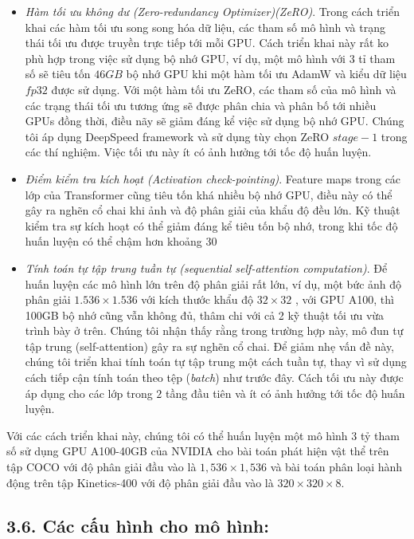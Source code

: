 \documentclass[times, twocolumn]{zHenriquesLab-StyleBioRxiv}
\begin{document}
\begin{itemize}
    \item \textit{Hàm tối ưu không dư (Zero-redundancy Optimizer)(ZeRO)}. Trong cách triển khai các hàm tối ưu song song hóa dữ liệu, các tham số mô hình và trạng thái tối ưu được truyền trực tiếp tới mỗi GPU. Cách triển khai này rất ko phù hợp trong việc sử dụng bộ nhớ GPU, ví dụ, một mô hình với $3$ tỉ tham số sẽ tiêu tốn $46GB$ bộ nhớ GPU khi một hàm tối ưu AdamW và kiểu dữ liệu $fp32$ được sử dụng. Với một hàm tối ưu ZeRO, các tham số của mô hình và các trạng thái tối ưu tương ứng sẽ được phân chia và phân bố tới nhiều GPUs đồng thời, điều nãy sẽ giảm đáng kể việc sử dụng bộ nhớ GPU. Chúng tôi áp dụng DeepSpeed framework và sử dụng tùy chọn ZeRO $stage-1$ trong các thí nghiệm. Việc tối ưu này ít có ảnh hưởng tới tốc độ huấn luyện.
    \item \textit{Điểm kiểm tra kích hoạt (Activation check-pointing)}. Feature maps trong các lớp của Transformer cũng tiêu tốn khá nhiều bộ nhớ GPU, điều này có thể gây ra nghẽn cổ chai khi ảnh và độ phân giải của khẩu độ đều lớn. Kỹ thuật kiểm tra sự kích hoạt có thể giảm đáng kể tiêu tốn bộ nhớ, trong khi tốc độ huấn luyện có thể chậm hơn khoảng 30%
    \item \textit{Tính toán tự tập trung tuần tự (sequential self-attention computation)}. Để huấn luyện các mô hình lớn trên độ phân giải rất lớn, ví dụ, một bức ảnh độ phân giải $1.536\times1.536$ với kích thước khẩu độ $32\times32$ , với GPU A100, thì 100GB bộ nhớ cũng vẫn không đủ, thâm chi với cả 2 kỹ thuật tối ưu vừa trình bày ở trên. Chúng tôi nhận thấy rằng trong trường hợp này, mô đun tự tập trung (self-attention) gây ra sự nghẽn cổ chai. Để giảm nhẹ vấn đề này, chúng tôi triển khai tính toán tự tập trung một cách tuần tự, thay vì sử dụng cách tiếp cận tính toán theo tệp (\textit{batch}) như trước đây. Cách tối ưu này được áp dụng cho các lớp trong $2$ tầng đầu tiên và ít có ảnh hưởng tới tốc độ huấn luyện.
\end{itemize}

Với các cách triển khai này, chúng tôi có thể huấn luyện một mô hình $3$ tỷ tham số sử dụng GPU A100-40GB của NVIDIA cho bài toán phát hiện vật thể trên tập COCO với độ phân giải đầu vào là $1,536\times1,536$ và bài toán phân loại hành động trên tập Kinetics-400 với độ phân giải đầu vào là $320\times320\times8$.

\subsection*{3.6. Các cấu hình cho mô hình:}
\end{document}
